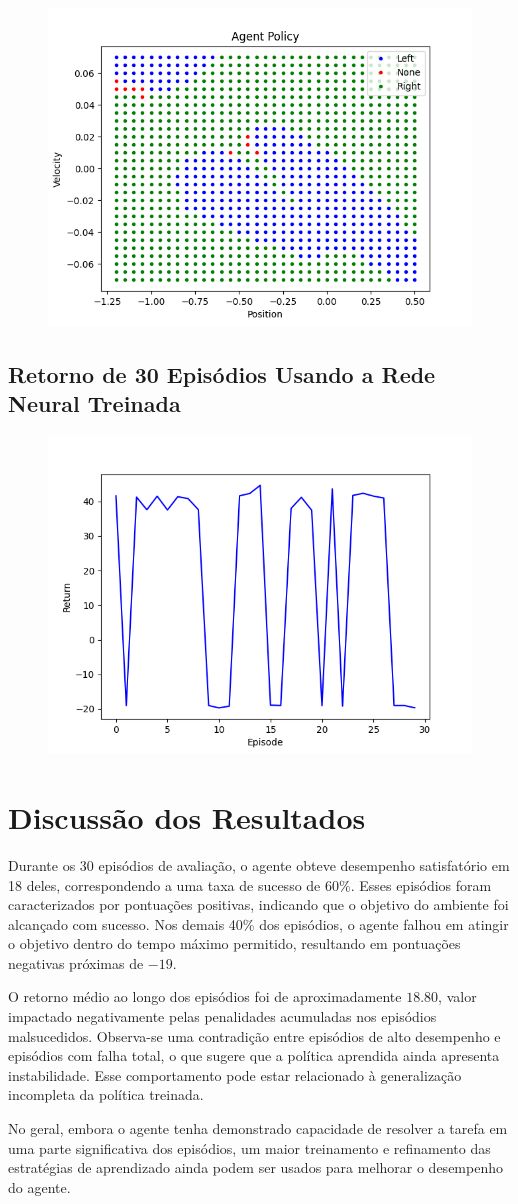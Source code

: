\documentclass[a4paper,12pt]{article}
\begin{document}
\begin{figure}[!h]
    \centering
    \includegraphics[width=0.6\linewidth]{agent_decision.png}
\end{figure}

\newpage

\subsection{Retorno de 30 Episódios Usando a Rede Neural Treinada}

\begin{figure}[!h]
    \centering
    \includegraphics[width=0.6\linewidth]{dqn_evaluation.png}
\end{figure}

\section{Discussão dos Resultados}

Durante os 30 episódios de avaliação, o agente obteve desempenho satisfatório em 18 deles, correspondendo a uma taxa de sucesso de 60\%. Esses episódios foram caracterizados por pontuações positivas, indicando que o objetivo do ambiente foi alcançado com sucesso. Nos demais 40\% dos episódios, o agente falhou em atingir o objetivo dentro do tempo máximo permitido, resultando em pontuações negativas próximas de $-19$.

O retorno médio ao longo dos episódios foi de aproximadamente $18.80$, valor impactado negativamente pelas penalidades acumuladas nos episódios malsucedidos. Observa-se uma contradição entre episódios de alto desempenho e episódios com falha total, o que sugere que a política aprendida ainda apresenta instabilidade. Esse comportamento pode estar relacionado à generalização incompleta da política treinada.

No geral, embora o agente tenha demonstrado capacidade de resolver a tarefa em uma parte significativa dos episódios, um maior treinamento e refinamento das estratégias de aprendizado ainda podem ser usados para melhorar o desempenho do agente.
\end{document}
